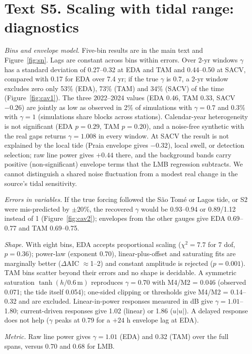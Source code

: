 \documentclass[11pt]{article}
\begin{document}
\section*{Text S5. Scaling with tidal range: diagnostics}
\textit{Bins and envelope model.} Five-bin results are in the main text and Figure~\ref{fig:sn}. Lags are constant across bins within errors. Over 2-yr windows $\gamma$ has a standard deviation of 0.27--0.32 at EDA and TAM and 0.44--0.50 at SACV, compared with 0.17 for EDA over 7.4 yr; if the true $\gamma$ is 0.7, a 2-yr window excludes zero only 53\% (EDA), 73\% (TAM) and 34\% (SACV) of the time (Figure~\ref{fig:cav1}). The three 2022--2024 values (EDA 0.46, TAM 0.33, SACV $-0.26$) are jointly as low as observed in 2\% of simulations with $\gamma=0.7$ and 0.3\% with $\gamma=1$ (simulations share blocks across stations). Calendar-year heterogeneity is not significant (EDA $p=0.29$, TAM $p=0.20$), and a noise-free synthetic with the real gaps returns $\gamma=1.008$ in every window. At SACV the result is not explained by the local tide (Praia envelope gives $-0.32$), local swell, or detection selection; raw line power gives $+0.44$ there, and the background bands carry positive (non-significant) envelope terms that the LMB regression subtracts. We cannot distinguish a shared noise fluctuation from a modest real change in the source's tidal sensitivity.

\textit{Errors in variables.} If the true forcing followed the S\~ao Tom\'e or Lagos tide, or S2 were mis-predicted by $\pm20\%$, the recovered $\gamma$ would be 0.93--0.94 or 0.89/1.12 instead of 1 (Figure~\ref{fig:cav2}); envelopes from the other gauges give EDA 0.69--0.77 and TAM 0.69--0.75.

\textit{Shape.} With eight bins, EDA accepts proportional scaling ($\chi^2=7.7$ for 7 dof, $p=0.36$); power-law (exponent 0.70), linear-plus-offset and saturating fits are marginally better ($\Delta$AIC $\approx$1--2) and constant amplitude is rejected ($p=0.001$). TAM bins scatter beyond their errors and no shape is decidable. A symmetric saturation $\tanh(h/0.6\,\mathrm{m})$ reproduces $\gamma=0.70$ with M4/M2 = 0.046 (observed 0.071; the tide itself 0.054); one-sided clipping or thresholds give M4/M2 = 0.14--0.32 and are excluded. Linear-in-power responses measured in dB give $\gamma=1.01$--1.80; current-driven responses give 1.02 (linear) or 1.86 ($u|u|$). A delayed response does not help ($\gamma$ peaks at 0.79 for a $+24$ h envelope lag at EDA).

\textit{Metric.} Raw line power gives $\gamma=1.01$ (EDA) and 0.32 (TAM) over the full spans, versus 0.70 and 0.68 for LMB.
\end{document}
